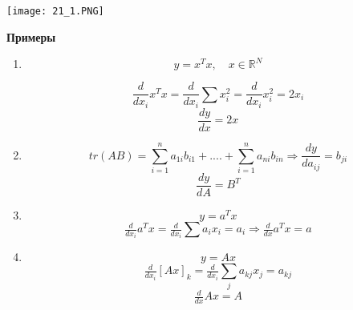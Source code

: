 \begin{center}
    \texttt{[image: 21\_1.PNG]}
\end{center}
\textbf{Примеры}
\begin{enumerate}
\item
$$  
y = x^Tx,  \quad x \in \mathbb{R}^N 
$$

$$\frac{d}{dx_i} x^T x = \frac{d}{dx_i}  \sum x_i^2 = \frac{d}{dx_i} x_i^2 = 2x_i$$
$$
\frac{dy}{dx} = 2x
$$ 
    \item $$tr(AB) = \sum\limits_{i=1}^n a_{1i}b_{i1} + .... + \sum\limits_{i=1}^n a_{ni}b_{in} \Longrightarrow \frac{dy}{da_{ij}} = b_{ji
}$$
$$
\frac{dy}{dA} = B^T
$$
\item
$$y = a^Tx$$
$$\tfrac{d}{dx_i} a^Tx = \tfrac{d}{dx_i}\sum a_ix_i = a_i \Longrightarrow \tfrac{d}{dx} a^Tx = a$$

\item
$$y = Ax$$
$$\tfrac{d}{dx_i} [Ax]_k = \tfrac{d}{dx_i}\sum_j a_{kj}x_j = a_{kj}$$
$$\tfrac{d}{dx} Ax = A$$
\end{enumerate}

